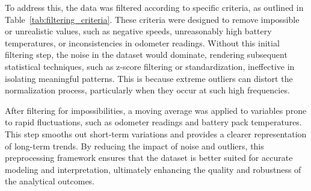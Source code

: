 To address this, the data was filtered according to specific criteria, as outlined in Table~\ref{tab:filtering_criteria}. 
These criteria were designed to remove impossible or unrealistic values, such as negative speeds, unreasonably high battery temperatures, or inconsistencies in odometer readings. 
Without this initial filtering step, the noise in the dataset would dominate, rendering subsequent statistical techniques, such as z-score filtering or standardization, ineffective in isolating meaningful patterns. 
This is because extreme outliers can distort the normalization process, particularly when they occur at such high frequencies.

After filtering for impossibilities, a moving average was applied to variables prone to rapid fluctuations, such as odometer readings and battery pack temperatures. 
This step smooths out short-term variations and provides a clearer representation of long-term trends. 
By reducing the impact of noise and outliers, this preprocessing framework ensures that the dataset is better suited for accurate modeling and interpretation, ultimately enhancing the quality and robustness of the analytical outcomes.

